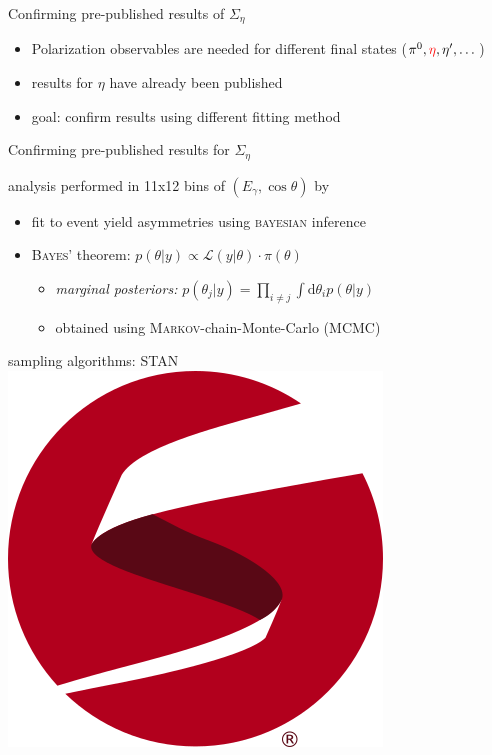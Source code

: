 \documentclass[11pt,aspectratio=169,dvipsnames]{beamer}
\newcommand{\thecolor}{black!70!blue}
\begin{document}
\begin{frame}{Confirming pre-published results of $\Sigma_\eta$}
	\begin{itemize}
		\item Polarization observables are needed for different final states ($\pi^0,{\color{red}\eta},\eta',\dots$)
		\item results for $\eta$ have already been published {\cites{eta}}
		\item goal: confirm results using different fitting method
	\end{itemize}
	
\end{frame}
\begin{frame}{Confirming pre-published results for $\Sigma_\eta$}
	
	\begin{minipage}{\linewidth}
		\begin{tcolorbox}[colback=blue!5,colframe=\thecolor,title={Event selection ($\eta$)}]
			analysis performed in 11x12 bins of $(E_\gamma,\cos\theta)$ by {\cites{eta}}
		\end{tcolorbox}
	\end{minipage}
	\begin{minipage}{\linewidth}
		\begin{tcolorbox}[colback=blue!5,colframe=\thecolor,title={Method}]
			\begin{itemize}
				\item fit to event yield asymmetries using \textsc{bayesian} inference
				\item \textsc{Bayes'} theorem: $p(\theta|y)\propto\mathcal{L}(y|\theta)\cdot\pi(\theta)$
				\begin{itemize}
					\item \emph{marginal posteriors:} $p(\theta_j|y)=\prod_{i\neq j}\int\text{d}\theta_i p(\theta|y)$
					\item obtained using \textsc{Markov}-chain-Monte-Carlo (MCMC)
					
				\end{itemize} 
			\end{itemize}
			\begin{flushright}
				sampling algorithms: STAN \includegraphics[width=.1\linewidth]{figs/logo-tm.png}\\
				\cites{stan}
			\end{flushright}
		\end{tcolorbox}
	\end{minipage}
\end{frame}
\end{document}
